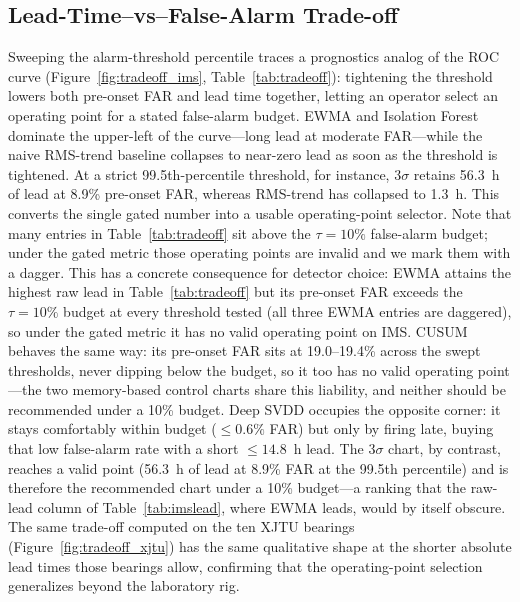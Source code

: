 \documentclass[IJPHM, 2026, 0]{PHMSociety}
\begin{document}
\subsection{Lead-Time--vs--False-Alarm Trade-off}
\label{sec:tradeoff}
Sweeping the alarm-threshold percentile traces a prognostics analog of the ROC curve (Figure~\ref{fig:tradeoff_ims}, Table~\ref{tab:tradeoff}): tightening the threshold lowers both pre-onset FAR and lead time together, letting an operator select an operating point for a stated false-alarm budget. EWMA and Isolation Forest dominate the upper-left of the curve---long lead at moderate FAR---while the naive RMS-trend baseline collapses to near-zero lead as soon as the threshold is tightened. At a strict 99.5th-percentile threshold, for instance, $3\sigma$ retains 56.3~h of lead at 8.9\% pre-onset FAR, whereas RMS-trend has collapsed to 1.3~h. This converts the single gated number into a usable operating-point selector. Note that many entries in Table~\ref{tab:tradeoff} sit above the $\tau=10\%$ false-alarm budget; under the gated metric those operating points are invalid and we mark them with a dagger. This has a concrete consequence for detector choice: EWMA attains the highest raw lead in Table~\ref{tab:tradeoff} but its pre-onset FAR exceeds the $\tau=10\%$ budget at every threshold tested (all three EWMA entries are daggered), so under the gated metric it has no valid operating point on IMS. CUSUM behaves the same way: its pre-onset FAR sits at 19.0--19.4\% across the swept thresholds, never dipping below the budget, so it too has no valid operating point---the two memory-based control charts share this liability, and neither should be recommended under a 10\% budget. Deep SVDD occupies the opposite corner: it stays comfortably within budget ($\le 0.6\%$ FAR) but only by firing late, buying that low false-alarm rate with a short $\le 14.8$~h lead. The $3\sigma$ chart, by contrast, reaches a valid point (56.3~h of lead at 8.9\% FAR at the 99.5th percentile) and is therefore the recommended chart under a 10\% budget---a ranking that the raw-lead column of Table~\ref{tab:imslead}, where EWMA leads, would by itself obscure. The same trade-off computed on the ten XJTU bearings (Figure~\ref{fig:tradeoff_xjtu}) has the same qualitative shape at the shorter absolute lead times those bearings allow, confirming that the operating-point selection generalizes beyond the laboratory rig.
\end{document}
